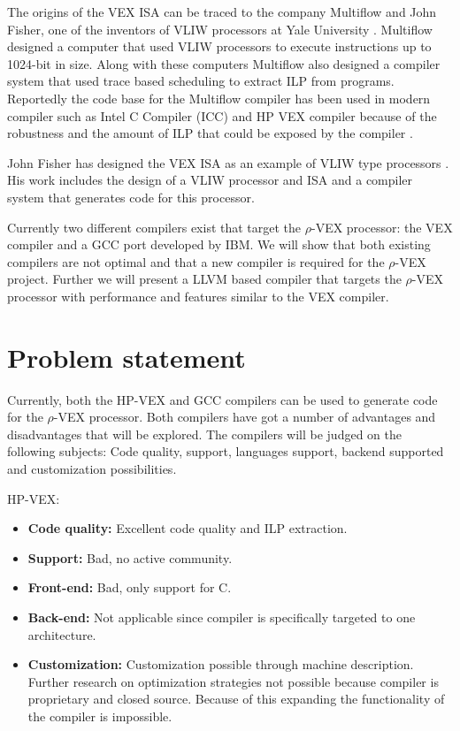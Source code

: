 The origins of the VEX ISA can be traced to the company Multiflow and John Fisher, one of the inventors of VLIW processors at Yale University \cite{Fisher:1983:VLI:1067651.801649}. Multiflow designed a computer that used VLIW processors to execute instructions up to 1024-bit in size. Along with these computers Multiflow also designed a compiler system that used trace based scheduling to extract ILP from programs. Reportedly the code base for the Multiflow compiler has been used in modern compiler such as Intel C Compiler (ICC) and HP VEX compiler because of the robustness and the amount of ILP that could be exposed by the compiler \cite{Lowney:1993qy}.

John Fisher has designed the VEX ISA as an example of VLIW type processors \cite{Joseph-A.-Fisher:2005cr}. His work includes the design of a VLIW processor and ISA and a compiler system that generates code for this processor.

Currently two different compilers exist that target the $\rho$-VEX processor: the VEX compiler and a GCC port developed by IBM. We will show that both existing compilers are not optimal and that a new compiler is required for the $\rho$-VEX project. Further we will present a LLVM based compiler that targets the $\rho$-VEX processor with performance and features similar to the VEX compiler. 

\section{Problem statement}
Currently, both the HP-VEX and GCC compilers can be used to generate code for the $\rho$-VEX processor. Both compilers have got a number of advantages and disadvantages that will be explored. The compilers will be judged on the following subjects: Code quality, support, languages support, backend supported and customization possibilities.
\newline

HP-VEX:
\begin{itemize}
	\item \textbf{Code quality:} Excellent code quality and ILP extraction.
	\item \textbf{Support:} Bad, no active community.
	\item \textbf{Front-end:} Bad, only support for C.
	\item \textbf{Back-end:} Not applicable since compiler is specifically targeted to one architecture.
	\item \textbf{Customization:} Customization possible through machine description. Further research on optimization strategies not possible because compiler is proprietary and closed source. Because of this expanding the functionality of the compiler is impossible.
\end{itemize}

